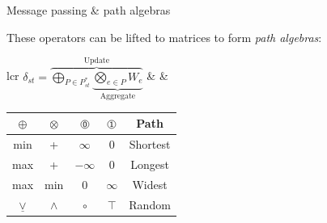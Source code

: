 \documentclass{beamer}
\begin{document}
\begin{frame}[fragile]{Message passing \& path algebras}
  \vspace{2pt}
  These operators can be lifted to matrices to form \textit{path algebras}:
  \begin{center}
    \begin{tabular}{lcr}
      $\delta_{st} = \overbrace{\underset{P\in P_{st}^*}{\bigoplus}\underbrace{\underset{e\in P}{\bigotimes}W_{e}}_{\text{Aggregate}}}^{\text{Update}}$ & &
      \bgroup
      \def\arraystretch{1.2}
      \begin{tabular}{c{1cm}c{1cm}|c{1cm}c{1cm}|c}
        $\oplus$         & $\otimes$ & $\circled{0}$ & $\circled{1}$ & Path     \\\hline
        min              & +         & $\infty$      & 0             & Shortest \\
        max              & +         & $-\infty$     & 0             & Longest  \\
        max              & min       & 0             & $\infty$      & Widest   \\
        $\underline\vee$ & $\land$   & $\circ$       & $\top$        & Random   \\
      \end{tabular}
      \egroup
    \end{tabular}
  \end{center}
\end{frame}
\end{document}
